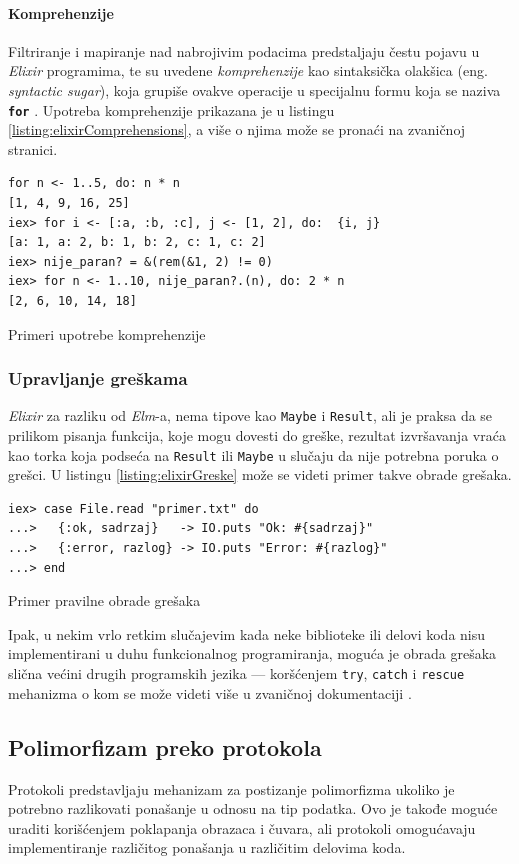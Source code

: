 \documentclass[12pt,oneside]{memoir}
\begin{document}
\paragraph{Komprehenzije}
Filtriranje i mapiranje nad nabrojivim podacima predstaljaju čestu pojavu u \emph{Elixir} programima,
te su uvedene \emph{komprehenzije} kao sintaksička olakšica (eng. \emph{syntactic sugar}), koja
grupiše ovakve operacije u specijalnu formu koja se naziva \texttt{\textbf{for}} . Upotreba komprehenzije
prikazana je u listingu \ref{listing:elixirComprehensions}, a više o njima može se pronaći na zvaničnoj
\cite{elixir} stranici.
\begin{listing}[!ht]
\begin{verbatim}
for n <- 1..5, do: n * n
[1, 4, 9, 16, 25]
iex> for i <- [:a, :b, :c], j <- [1, 2], do:  {i, j}
[a: 1, a: 2, b: 1, b: 2, c: 1, c: 2]
iex> nije_paran? = &(rem(&1, 2) != 0)
iex> for n <- 1..10, nije_paran?.(n), do: 2 * n
[2, 6, 10, 14, 18]
\end{verbatim}
\caption{Primeri upotrebe komprehenzije}
\label{listing:elixirComprehensions}
\end{listing}
\subsubsection{Upravljanje greškama}
\emph{Elixir} za razliku od \emph{Elm}-a, nema tipove kao \texttt{Maybe} i \texttt{Result}, ali je praksa
da se prilikom pisanja funkcija, koje mogu dovesti do greške, rezultat izvršavanja vraća kao
torka koja podseća na \texttt{Result} ili \texttt{Maybe} u slučaju da nije potrebna poruka o
grešci. U listingu \ref{listing:elixirGreske} može se videti primer takve obrade grešaka.
\begin{listing}[!ht]
\begin{verbatim}
iex> case File.read "primer.txt" do
...>   {:ok, sadrzaj}   -> IO.puts "Ok: #{sadrzaj}"
...>   {:error, razlog} -> IO.puts "Error: #{razlog}"
...> end
\end{verbatim}
\caption{Primer pravilne obrade grešaka}
\label{listing:elixirGreske}
\end{listing}
Ipak, u nekim vrlo retkim slučajevim kada neke biblioteke ili delovi koda nisu implementirani
u duhu funkcionalnog programiranja, moguća je obrada grešaka slična većini drugih programskih
jezika --- koršćenjem \texttt{try}, \texttt{catch} i \texttt{rescue} mehanizma o kom se može
videti više u zvaničnoj dokumentaciji \cite{elixir}.
\subsection{Polimorfizam preko protokola}
Protokoli predstavljaju mehanizam za postizanje polimorfizma ukoliko je potrebno razlikovati
ponašanje u odnosu na tip podatka. Ovo je takođe moguće uraditi korišćenjem poklapanja
obrazaca i čuvara, ali protokoli omogućavaju implementiranje različitog ponašanja u
različitim delovima koda.
\end{document}
